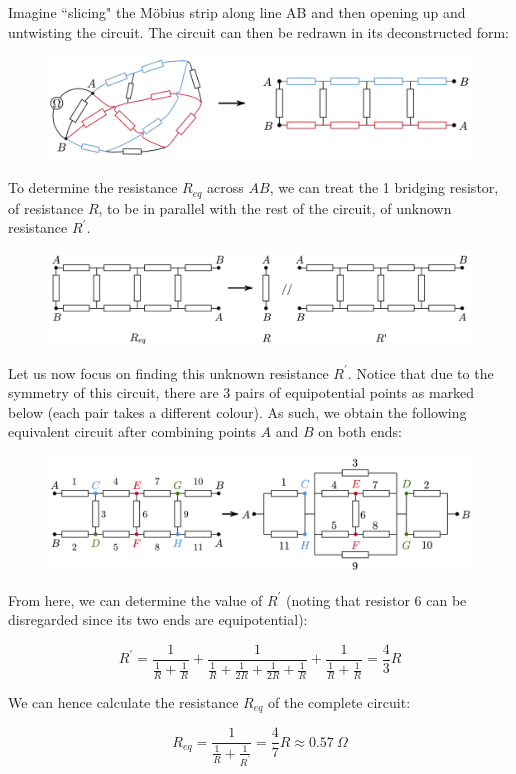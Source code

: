 \begin{solution}
Imagine ``slicing" the M\"{o}bius strip along line AB and then opening up and untwisting the circuit. The circuit can then be redrawn in its deconstructed form:

\begin{figure}[H]
    \centering
    \includegraphics[width=15cm]{images/Mobius_strip_1.png}
\end{figure}

To determine the resistance $R_{eq}$ across $AB$, we can treat the 1 bridging resistor, of resistance $R$, to be in parallel with the rest of the circuit, of unknown resistance $R^\prime$.

\begin{figure}[H]
    \centering
    \includegraphics[width=15cm]{images/Mobius_strip_2.png}
\end{figure}

Let us now focus on finding this unknown resistance $R^\prime$. Notice that due to the symmetry of this circuit, there are 3 pairs of equipotential points as marked below (each pair takes a different colour). As such, we obtain the following equivalent circuit after combining points $A$ and $B$ on both ends:

\begin{figure}[H]
    \centering
    \includegraphics[width=15cm]{images/Mobius_strip_3.png}
\end{figure}

From here, we can determine the value of $R^\prime$ (noting that resistor 6 can be disregarded since its two ends are equipotential):

\[ R^\prime = \frac{1}{\frac{1}{R}+\frac{1}{R}} + \frac{1}{\frac{1}{R}+\frac{1}{2R}+\frac{1}{2R}+\frac{1}{R}} + \frac{1}{\frac{1}{R}+\frac{1}{R}} = \frac{4}{3}R \]

We can hence calculate the resistance $R_{eq}$ of the complete circuit:

\[ R_{eq} = \frac{1}{\frac{1}{R}+\frac{1}{R^\prime}} = \frac{4}{7}R \approx \boxed{0.57\:\Omega} \]
\end{solution}
\pagebreak

